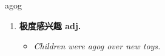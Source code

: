 
\begin{frame}
{\huge agog}
\begin{center}
\begin{enumerate}\Large
  \item \textbf{极度感兴趣 adj.}
  \begin{itemize}
    \item \em{\Large{Children were agog over new toys.}}
  \end{itemize}
\end{enumerate}
\end{center}
\end{frame}

